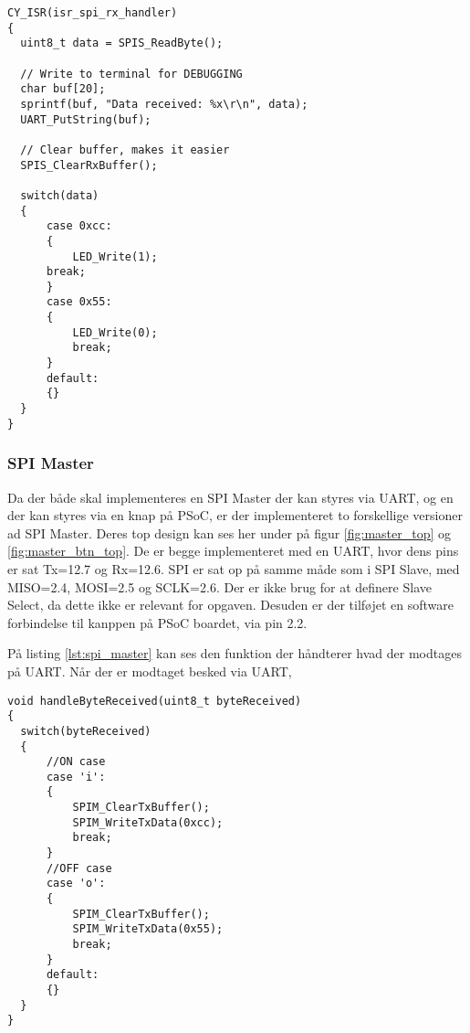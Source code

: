 \documentclass[../main.tex]{subfiles}
\begin{document}
\begin{lstlisting}[caption={SPI Slave}, label=lst:spi_slave]
CY_ISR(isr_spi_rx_handler)
{
  uint8_t data = SPIS_ReadByte();
  
  // Write to terminal for DEBUGGING
  char buf[20];
  sprintf(buf, "Data received: %x\r\n", data);
  UART_PutString(buf);
  
  // Clear buffer, makes it easier
  SPIS_ClearRxBuffer();
  
  switch(data)
  {
      case 0xcc:
      {
          LED_Write(1);
      break;   
      }
      case 0x55:
      {
          LED_Write(0);
          break;
      }
      default:
      {}
  }
}
\end{lstlisting}

\subsubsection{SPI Master}

Da der både skal implementeres en SPI Master der kan styres via UART, og en der kan styres via en knap på PSoC, er der implementeret to forskellige versioner ad SPI Master. Deres top design kan ses her under på figur \ref{fig:master_top} og \ref{fig:master_btn_top}.
De er begge implementeret med en UART, hvor dens pins er sat Tx=12.7 og Rx=12.6. SPI er sat op på samme måde som i SPI Slave, med MISO=2.4, MOSI=2.5 og SCLK=2.6. Der er ikke brug for at definere Slave Select, da dette ikke er relevant for opgaven. Desuden er der tilføjet en software forbindelse til kanppen på PSoC boardet, via pin 2.2.



På listing \ref{lst:spi_master} kan ses den funktion der håndterer hvad der modtages på UART. Når der er modtaget besked via UART, 

\begin{lstlisting}[caption={Håndtergin af Bytes Received fra UART til SPI Master}, label=lst:spi_master]
void handleByteReceived(uint8_t byteReceived)
{
  switch(byteReceived)
  {
      //ON case
      case 'i': 
      {
          SPIM_ClearTxBuffer();
          SPIM_WriteTxData(0xcc);            
          break;
      }
      //OFF case
      case 'o': 
      {
          SPIM_ClearTxBuffer();
          SPIM_WriteTxData(0x55);
          break;
      }
      default:
      {}
  }
}
\end{lstlisting}
\end{document}

